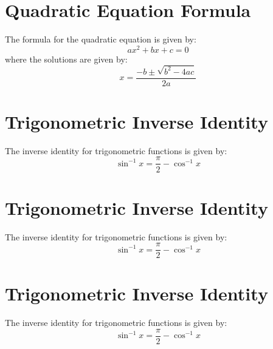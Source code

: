 \documentclass{article}
\begin{document}
\section{Quadratic Equation Formula}
The formula for the quadratic equation is given by:
\begin{equation}
ax^2 + bx + c = 0
\end{equation}
where the solutions are given by:
\begin{equation}
x = \frac{-b \pm \sqrt{b^2 - 4ac}}{2a}
\end{equation}

\section{Trigonometric Inverse Identity}
The inverse identity for trigonometric functions is given by:
\begin{equation}
\sin^{-1} x = \frac{\pi}{2} - \cos^{-1} x
\end{equation}

\section{Trigonometric Inverse Identity}
The inverse identity for trigonometric functions is given by:
\begin{equation}
\sin^{-1} x = \frac{\pi}{2} - \cos^{-1} x
\end{equation}

\section{Trigonometric Inverse Identity}
The inverse identity for trigonometric functions is given by:
\begin{equation}
\sin^{-1} x = \frac{\pi}{2} - \cos^{-1} x
\end{equation}
\end{document}

